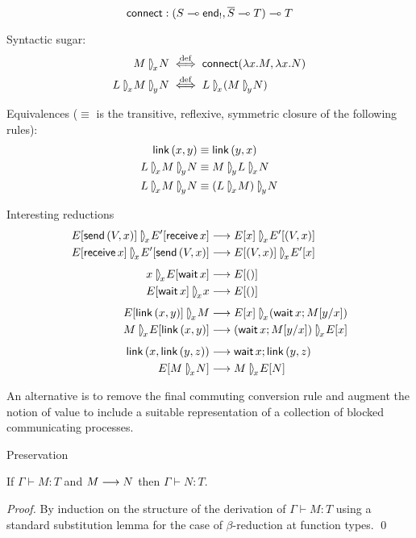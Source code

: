 \documentclass[orivec,envcountsame]{llncs}
\begin{document}
\[
\mathsf{connect} : (S \multimap \mathsf{end}_!, \overline{S} \multimap T) \multimap T
\]

Syntactic sugar:
\begin{align*}
\con{M}{x}{N} &\defiff \gvconst{connect}(\lambda x.M, \lambda x.N) \\
\con{L}{x}{\con{M}{y}{N}} &\defiff \con{L}{x}{(\con{M}{y}{N})} \\
\end{align*}

Equivalences ($\equiv$ is the transitive, reflexive, symmetric closure of the following rules):
\begin{align*}
\gvconst{link}\,(x,y) &\equiv \gvconst{link}\,(y,x) \\
\con{L}{x}{\con{M}{y}{N}} &\equiv \con{M}{y}{\con{L}{x}{N}} \\
\con{L}{x}{\con{M}{y}{N}} &\equiv \con{(\con{L}{x}{M})}{y}{N} \\
\end{align*}

Interesting reductions
\begin{align*}
\con{E[\gvconst{send}\,(V,x)]}{x}{E'[\gvconst{receive}\,x]}
  &\rto \con{E[x]}{x}{E'[(V,x)]} \\
\con{E[\gvconst{receive}\,x]}{x}{E'[\gvconst{send}\,(V,x)]}
  &\rto \con{E[(V,x)]}{x}{E'[x]} \\[1ex]
\con{x}{x}{E[\gvconst{wait}\,x]}
  &\rto E[()] \\
\con{E[\gvconst{wait}\,x]}{x}{x}
  &\rto E[()] \\[1ex]
\con{E[\gvconst{link}\,(x,y)]}{x}{M}
  &\rto \con{E[x]}{x}{(\gvconst{wait}\,x; M[y/x])} \\
\con{M}{x}{E[\gvconst{link}\,(x,y)]}
  &\rto \con{(\gvconst{wait}\,x; M[y/x])}{x}{E[x]} \\[1ex]
\gvconst{link}\,(x,\gvconst{link}\,(y,z))
  &\rto \gvconst{wait}\,x; \gvconst{link}\,(y,z) \\
E[\con{M}{x}{N}]
  &\rto \con{M}{x}{E[N]} \\
\end{align*}

An alternative is to remove the final commuting conversion rule and augment the notion of value to
include a suitable representation of a collection of blocked communicating processes.

Preservation
\begin{theorem}
If $\Gamma \vdash M : T$ and $M \longrightarrow N$ then $\Gamma \vdash N : T$.
\end{theorem}
%
\begin{proof}
By induction on the structure of the derivation of $\Gamma \vdash M : T$ using a standard
substitution lemma for the case of $\beta$-reduction at function types. \qed
\end{proof}
\end{document}
